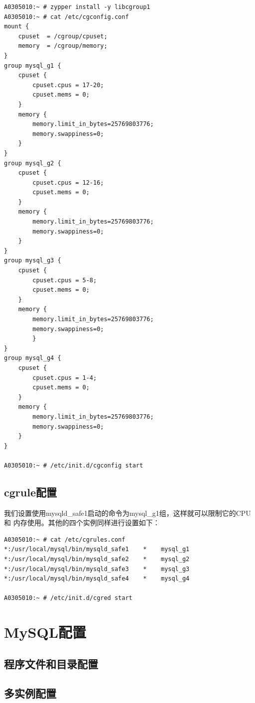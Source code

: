 \begin{verbatim}
A0305010:~ # zypper install -y libcgroup1
A0305010:~ # cat /etc/cgconfig.conf
mount {
    cpuset  = /cgroup/cpuset;
    memory  = /cgroup/memory;
}
group mysql_g1 {
    cpuset {
        cpuset.cpus = 17-20;
        cpuset.mems = 0;
    }
    memory {
        memory.limit_in_bytes=25769803776;
        memory.swappiness=0;
    }
}
group mysql_g2 {
    cpuset {
        cpuset.cpus = 12-16;
        cpuset.mems = 0;
    }
    memory {
        memory.limit_in_bytes=25769803776;
        memory.swappiness=0;
    }
}
group mysql_g3 {
    cpuset {
        cpuset.cpus = 5-8;
        cpuset.mems = 0;
    }
    memory {
        memory.limit_in_bytes=25769803776;
        memory.swappiness=0;
        }
}
group mysql_g4 {
    cpuset {
        cpuset.cpus = 1-4;
        cpuset.mems = 0;
    }
    memory {
        memory.limit_in_bytes=25769803776;
        memory.swappiness=0;
    }
}

A0305010:~ # /etc/init.d/cgconfig start
\end{verbatim}

\subsection{cgrule配置}

我们设置使用mysqld\_safe1启动的命令为mysql\_g1组，这样就可以限制它的CPU和
内存使用。其他的四个实例同样进行设置如下：

\begin{verbatim}
A0305010:~ # cat /etc/cgrules.conf
*:/usr/local/mysql/bin/mysqld_safe1    *    mysql_g1
*:/usr/local/mysql/bin/mysqld_safe2    *    mysql_g2
*:/usr/local/mysql/bin/mysqld_safe3    *    mysql_g3
*:/usr/local/mysql/bin/mysqld_safe4    *    mysql_g4

A0305010:~ # /etc/init.d/cgred start
\end{verbatim}

\section{MySQL配置}
\subsection{程序文件和目录配置}
\subsection{多实例配置}

